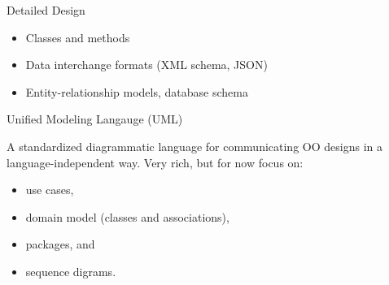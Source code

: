 \documentclass{beamer}
\begin{document}














\begin{frame}[fragile]{Detailed Design}


\begin{itemize}
\item Classes and methods
\item Data interchange formats (XML schema, JSON)
\item Entity-relationship models, database schema
\end{itemize}


\end{frame}

\begin{frame}[fragile]{Unified Modeling Langauge (UML)}


A standardized diagrammatic language for communicating OO designs in a language-independent way.  Very rich, but for now focus on:
\begin{itemize}
\item use cases,
\item domain model (classes and associations),
\item packages, and
\item sequence digrams.
\end{itemize}


\end{frame}
\end{document}
